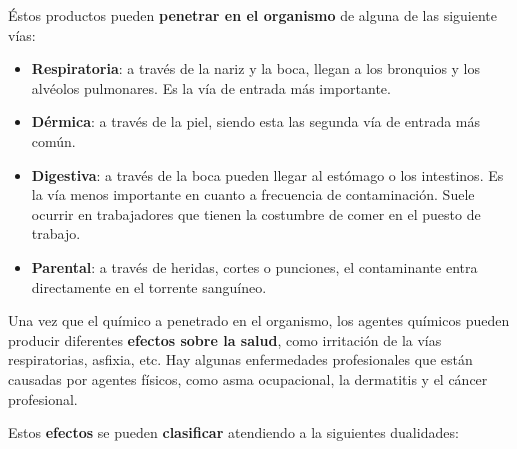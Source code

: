 Éstos productos pueden \textbf{penetrar en el organismo} de alguna de las siguiente vías:

\begin{itemize}
    \item \textbf{Respiratoria}: a través de la nariz y la boca, llegan a los bronquios y los alvéolos pulmonares. Es la vía de entrada más importante.
    \item \textbf{Dérmica}: a través de la piel, siendo esta las segunda vía de entrada más común.
    \item \textbf{Digestiva}: a través de la boca pueden llegar al estómago o los intestinos. Es la vía menos importante en cuanto a frecuencia de contaminación. Suele ocurrir en trabajadores que tienen la costumbre de comer en el puesto de trabajo.
    \item \textbf{Parental}: a través de heridas, cortes o punciones, el contaminante entra directamente en el torrente sanguíneo.
\end{itemize}

Una vez que el químico a penetrado en el organismo, los agentes químicos pueden producir diferentes \textbf{efectos sobre la salud}, como irritación de la vías respiratorias, asfixia, etc. Hay algunas enfermedades profesionales que están causadas por agentes físicos, como asma ocupacional, la dermatitis y el cáncer profesional.

Estos \textbf{efectos} se pueden \textbf{clasificar} atendiendo a la siguientes dualidades:

